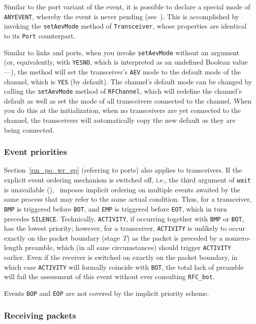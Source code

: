 Similar to the port variant of the event, it is possible to
declare a special mode of {\tt ANYEVENT}, whereby the event is never pending
(see~).
This is accomplished by invoking the {\tt setAevMode} method of
{\tt Transceiver}, whose properties are identical to its {\tt Port}
counterpart.

Similar to links and ports,
when you invoke {\tt setAevMode} without an argument (or, equivalently, with
{\tt YESNO}, which is interpreted as an undefined Boolean
value---), the method
will set the transceiver's {\tt AEV} mode to the default mode of the channel, which is
{\tt YES} (by default).
The channel's default mode can be changed by calling the {\tt setAevMode} method
of {\tt RFChannel}, which will redefine the channel's default as well as set the mode of
all transceivers connected to the channel.
When you do this at the initialization, when no transceivers are yet connected to the
channel, the transceivers will automatically
copy the new default as they are being connected.

\subsubsection{Event priorities}
\label{rm_tr_pp_ep}

Section~\ref{rm_po_wr_ep} (referring to ports) also applies to
transceivers.
If the explicit event ordering mechanism is switched off, i.e.,
the third argument of {\tt wait} is unavailable (),
\smurph\ imposes implicit ordering on multiple events awaited by the
same process that may refer to the same actual condition.
Thus, for a transceiver,
{\tt BMP} is triggered before {\tt BOT}, and {\tt EMP} is triggered
before {\tt EOT}, which in turn precedes {\tt SILENCE}.
Technically, {\tt ACTIVITY}, if occurring together with {\tt BMP} or
{\tt BOT}, has the lowest priority; however, for a transceiver, 
{\tt ACTIVITY} is unlikely to occur exactly on the packet boundary
(stage {\em T\/}) as the packet is preceded by a nonzero-length preamble,
which (in all sane circumstances) should trigger {\tt ACTIVITY} earlier.
Even if the receiver is switched on exactly on the packet boundary, in
which case {\tt ACTIVITY} will formally coincide with {\tt BOT},
the total lack of preamble will fail the assessment of this event
without ever consulting {\tt RFC\_bot}.

Events {\tt BOP} and {\tt EOP} are not covered by the implicit
priority scheme.

\subsubsection{Receiving packets}
\label{rm_tr_pp_rp}

